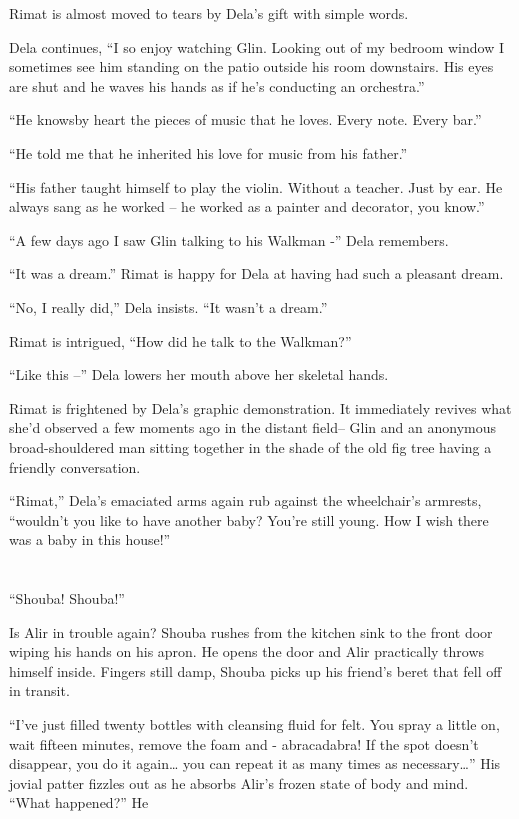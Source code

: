 \documentclass[twoside,11pt]{book}
\begin{document}
Rimat is almost moved to tears by Dela's gift with simple words.

Dela continues, ``I so enjoy watching Glin. Looking out of my bedroom window I sometimes see him standing
on the patio outside his room downstairs. His eyes are shut and he waves his hands as if he's conducting an
orchestra.''

``He knowsby heart the pieces of music that he loves. Every note. Every bar.''

``He told me that he inherited his love for music from his father.''

``His father taught himself to play the violin. Without a teacher. Just by ear. He always sang as he worked
-- he worked as a painter and decorator, you know.''

``A few days ago I saw Glin talking to his Walkman -'' Dela remembers.

``It was a dream.'' Rimat is happy for Dela at having had such a pleasant dream.

``No, I really did,'' Dela insists. ``It wasn't a dream.''

Rimat  is intrigued, ``How did he talk to the Walkman?''

``Like this --'' Dela lowers her mouth above her skeletal hands.

Rimat is frightened by Dela's graphic demonstration. It immediately revives what she'd observed a few moments ago in the
distant field-- Glin and an anonymous broad-shouldered man sitting together in the shade of the old fig tree having a
friendly conversation.

``Rimat,'' Dela's emaciated arms again rub against the wheelchair's armrests,
``wouldn't you like to have another baby? You're still young. How I wish there was a baby in this
house!''


\bigskip

\chapter{}

``Shouba! Shouba!''

Is Alir in trouble again?  Shouba rushes from the kitchen sink to the front door wiping his hands on his apron. He opens
the door and Alir practically throws himself inside. Fingers still damp, Shouba picks up his friend's beret that fell
off in transit.

``I've just filled twenty bottles with cleansing fluid for felt. You spray a little on, wait fifteen
minutes, remove the foam and - abracadabra! If the spot doesn't disappear, you do it again{\dots} you can repeat it as
many times as necessary{\dots}'' His jovial patter fizzles out as he absorbs Alir's frozen state of body
and mind. ``What happened?'' He
\end{document}
